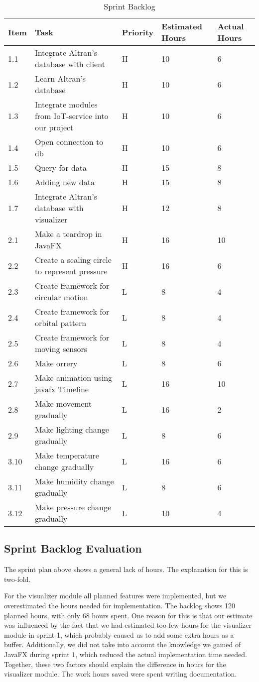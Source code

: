 \documentclass[../document]{subfiles}
\begin{document}
\begin{table}[H]
\caption{Sprint Backlog}
\centering
\begin{tabularx}{\textwidth}{|l|X|l|l|l|}
\hline
Item
&Task
&Priority
&Estimated Hours
&Actual Hours
\\ \hline 1.1
&Integrate Altran's database with client
&H
&10
&6
\\ \hline 1.2
&Learn Altran's database
&H
&10
&6
\\ \hline 1.3
&Integrate modules from IoT-service into our project
&H
&10
&6
\\ \hline 1.4
&Open connection to db
&H
&10
&6
\\ \hline 1.5
&Query for data
&H
&15
&8
\\ \hline 1.6
&Adding new data
&H
&15
&8
\\ \hline 1.7
&Integrate Altran's database with visualizer
&H
&12
&8
\\ \hline 2.1
&Make a teardrop in JavaFX
&H
&16
&10
\\ \hline 2.2
&Create a scaling circle to represent pressure
&H
&16
&6
\\ \hline 2.3
&Create framework for circular motion
&L
&8
&4
\\ \hline 2.4
&Create framework for orbital pattern
&L
&8
&4
\\ \hline 2.5
&Create framework for moving sensors
&L
&8
&4
\\ \hline 2.6
&Make orrery
&L
&8
&6
\\ \hline 2.7
&Make animation using javafx Timeline
&L
&16
&10
\\ \hline 2.8
&Make movement gradually
&L
&16
&2
\\ \hline 2.9
&Make lighting change gradually
&L
&8
&6
\\ \hline 3.10
&Make temperature change gradually
&L
&16
&6
\\ \hline 3.11
&Make humidity change gradually
&L
&8
&6
\\ \hline 3.12
&Make pressure change gradually
&L
&10
&4
\\ \hline 
\end{tabularx}
\end{table}

\subsection{Sprint Backlog Evaluation}
The sprint plan above shows a general lack of hours. The explanation for this is two-fold.

For the visualizer module all planned features were implemented, but we overestimated the hours needed for implementation. The backlog shows 120 planned hours, with only 68 hours spent. One reason for this is that our estimate was influenced by the fact that we had estimated too few hours for the visualizer module in sprint 1, which probably caused us to add some extra hours as a buffer. Additionally, we did not take into account the knowledge we gained of JavaFX during sprint 1, which reduced the actual implementation time needed. Together, these two factors should explain the difference in hours for the visualizer module. The work hours saved were spent writing documentation.
\end{document}
